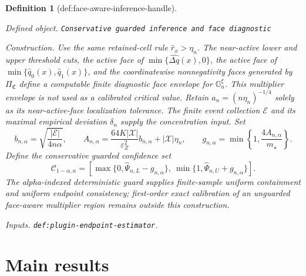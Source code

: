 \documentclass{article}
\newtheorem{definition}{Definition}
\begin{document}
\begin{definition}[def:face-aware-inference-handle]\label{def:face-aware-inference-handle}
\par\smallskip\noindent\emph{Defined object.} \texttt{Conservative guarded inference and face diagnostic}
\par\smallskip\noindent\emph{Construction.} Use the same retained-cell rule \(\widehat r_x>\eta_n\).  The near-active lower and upper threshold cuts, the active face of \(\min\{\widehat{\Delta q}(x),0\}\), the active face of \(\min\{\widehat q_0(x),\widehat q_1(x)\}\), and the coordinatewise nonnegativity faces generated by \(\Pi_{\mathfrak C}\) define a computable finite diagnostic face envelope for \(\mathbb G_n^\xi\).  This multiplier envelope is not used as a calibrated critical value.  Retain \(a_n=(n\eta_n)^{-1/4}\) solely as its near-active-face localization tolerance.  The finite event collection \(\mathcal E\) and its maximal empirical deviation \(\delta_n\) supply the concentration input.  Set
\[
b_{n,\alpha}=\sqrt{\frac{|\mathcal E|}{4n\alpha}},\qquad
A_{n,\alpha}=\frac{64K|\mathcal X|}{\varepsilon_Z^2}b_{n,\alpha}+|\mathcal X|\eta_n,
\qquad
g_{n,\alpha}=\min\left\{1,\frac{4A_{n,\alpha}}{m_{\star}}\right\}.
\]
Define the conservative guarded confidence set
\[
\mathcal C_{1-\alpha,n}=
\left[\max\{0,\widehat\Psi_{n,L}-g_{n,\alpha}\},\
\min\{1,\widehat\Psi_{n,U}+g_{n,\alpha}\}\right].
\]
The alpha-indexed deterministic guard supplies finite-sample uniform containment and uniform endpoint consistency; first-order exact calibration of an unguarded face-aware multiplier region remains outside this construction.
\par\smallskip\noindent\emph{Inputs.} \texttt{def:\allowbreak{}plugin-\allowbreak{}endpoint-\allowbreak{}estimator}.
\end{definition}

\section{Main results}
\end{document}

